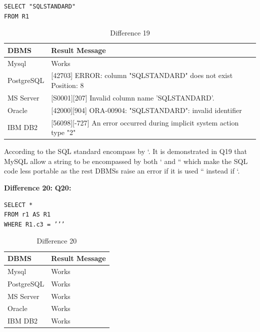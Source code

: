 \begin{mdframed}[backgroundcolor=lightgray!20]
\begin{lstlisting}[style=SQL]
SELECT "SQLSTANDARD"
FROM R1
\end{lstlisting}
\end{mdframed}

 
\begin{table}[h]
\centering
\caption{Difference 19}
\label{my-label}
\begin{tabular}{|p{2cm}|p{11.5cm}| }
\hline
\textbf{DBMS} & \textbf{Result Message}                                                        \\ \hline
Mysql         & Works                                                                          \\ \hline
PostgreSQL    & {[}42703{]} ERROR: column "SQLSTANDARD" does not exist Position: 8             \\ \hline
MS Server     & {[}S0001{]}{[}207{]} Invalid column name 'SQLSTANDARD'.                        \\ \hline
Oracle        & {[}42000{]}{[}904{]} ORA-00904: "SQLSTANDARD": invalid identifier              \\ \hline
IBM DB2       & {[}56098{]}{[}-727{]} An error occurred during implicit system action type "2" \\ \hline
\end{tabular}
\end{table}

\hfill\newpage
According to the SQL standard encompass by ‘. It is demonstrated in Q19 that MySQL allow a string to be encompassed by both ‘ and “ which make the SQL code less portable as the rest DBMSs raise an error if it is used “ instead if ‘. 


\hfill\newline\textbf{Difference 20:}
\hfill\newline\textbf{Q20:}

\begin{mdframed}[backgroundcolor=lightgray!20]
\begin{lstlisting}[style=SQL]
SELECT *
FROM r1 AS R1
WHERE R1.c3 = ’’’
\end{lstlisting}
\end{mdframed}
 
\begin{table}[h]
\centering
\caption{Difference 20}
\label{my-label}
\begin{tabular}{|p{2cm}|p{11.5cm}| }
\hline
\textbf{DBMS} & \textbf{Result Message} \\ \hline
Mysql         & Works                   \\ \hline
PostgreSQL    & Works                   \\ \hline
MS Server     & Works                   \\ \hline
Oracle        & Works                   \\ \hline
IBM DB2       & Works                   \\ \hline
\end{tabular}
\end{table}


